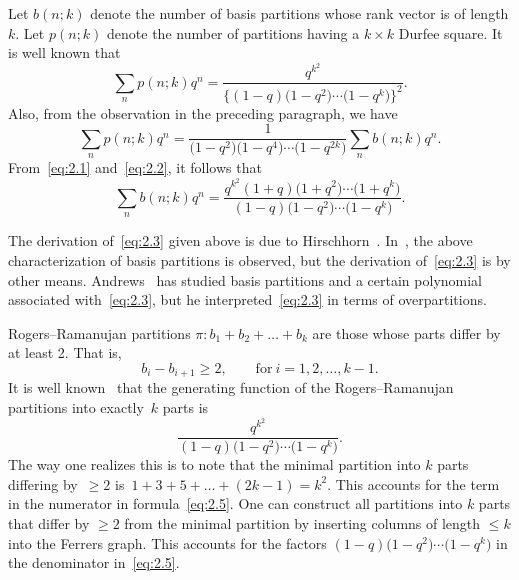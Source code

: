 \documentclass[10pt,a4paper]{amsart}
\numberwithin{equation}{section}
\theoremstyle{definition}
\begin{document}
Let $b(n;k)$ denote the number of basis partitions whose rank vector
is of length $k$. Let $p(n;k)$ denote the number of partitions
having a $k\times k$ Durfee square. It is well known that
\begin{equation}
\sum_{n}p(n;k)q^n=\frac{q^{k^2}}{\bigl\{(1-q)\bigl(1-q^2\bigr)\cdots \bigl(1-q^k\bigr)\bigr\}^2}.\label{eq:2.1}
\end{equation}
Also, from the observation in the preceding paragraph, we have
\begin{equation}
\sum_{n}p(n;k)q^n=\frac{1}{\bigl(1-q^2\bigr)\bigl(1-q^4\bigr)\cdots \bigl(1-q^{2k}\bigr)}
\sum_{n}b(n;k)q^n.\label{eq:2.2}
\end{equation}
From~\eqref{eq:2.1} and~\eqref{eq:2.2}, it follows that
\begin{equation}
\sum_{n}b(n;k)q^n=\frac{q^{k^2}(1+q)\bigl(1+q^2\bigr)\cdots \bigl(1+q^k\bigr)}
{(1-q)\bigl(1-q^2\bigr)\cdots \bigl(1-q^k\bigr)}.\label{eq:2.3}
\end{equation}

The derivation of~\eqref{eq:2.3} given above is due to Hirschhorn~\cite{Hi0099}.
In~\cite{No-Sa-Wi0098}, the above characterization of basis partitions is observed,
but the derivation of~\eqref{eq:2.3} is by other means. Andrews~\cite{An2015} has studied basis partitions and a certain polynomial associated with~\eqref{eq:2.3}, but he interpreted~\eqref{eq:2.3} in terms of overpartitions.

Rogers--Ramanujan partitions $\pi\colon b_1+b_2+\dots +b_k$ are those whose
parts differ by at least 2. That is,
\begin{equation*}
b_i-b_{i+1}\ge 2, \qquad \text{for} \ i=1,2,\dots , k-1.%
\end{equation*}
It is well known~\cite{An-book} that the generating function of the Rogers--Ramanujan
partitions into exactly~$k$ parts is
\begin{equation}
\frac{q^{k^2}}{(1-q)\bigl(1-q^2\bigr)\cdots \bigl(1-q^k\bigr)}.\label{eq:2.5}
\end{equation}
The way one realizes this is to note that the minimal partition into
$k$ parts differing by~\mbox{$\ge 2$} is~$1+3+5+\dots + (2k-1)=k^2$. This accounts
for the term  in the numerator in formula~\eqref{eq:2.5}. One can construct all
partitions into $k$ parts that differ by $\ge 2$ from the minimal partition
by inserting columns of length $\le k$ into the Ferrers graph. This accounts
for the factors ${(1-q)\bigl(1-q^2\bigr)\cdots \bigl(1-q^k\bigr)}$ in the denominator in~\eqref{eq:2.5}.
\end{document}
